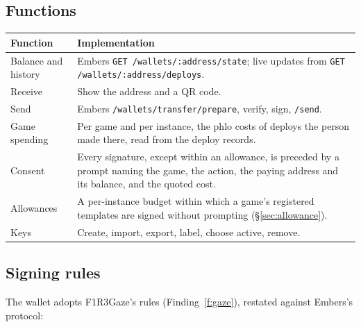 \documentclass[11pt]{article}
\theoremstyle{definition}
\theoremstyle{remark}
\newcommand{\code}[1]{\texttt{#1}}
\newcommand{\Em}{Embers}
\newcommand{\Gz}{F1R3Gaze}
\begin{document}
\subsection{Functions}

\begin{longtable}{@{}>{\raggedright\arraybackslash}p{}>{\raggedright\arraybackslash}p{}@{}}
\toprule
Function & Implementation\\
\midrule
\endhead
Balance and history & \Em{} \code{GET /wallets/:address/state}; live updates from
\code{GET /wallets/:address/deploys}.\\
Receive & Show the address and a QR code.\\
Send & \Em{} \code{/wallets/transfer/prepare}, verify, sign, \code{/send}.\\
Game spending & Per game and per instance, the phlo costs of deploys the person made
there, read from the deploy records.\\
Consent & Every signature, except within an allowance, is preceded by a prompt naming
the game, the action, the paying address and its balance, and the quoted cost.\\
Allowances & A per-instance budget within which a game's registered templates are
signed without prompting (\S\ref{sec:allowance}).\\
Keys & Create, import, export, label, choose active, remove.\\
\bottomrule
\end{longtable}

\subsection{Signing rules}\label{sec:signrules}

The wallet adopts \Gz{}'s rules (Finding~\ref{f:gaze}), restated against \Em{}'s
protocol:
\end{document}
